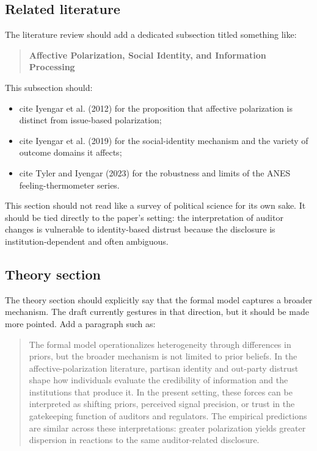 \documentclass[12pt]{article}
\begin{document}
\subsection{Related literature}

The literature review should add a dedicated subsection titled something like:

\begin{quote}
\textbf{Affective Polarization, Social Identity, and Information Processing}
\end{quote}

This subsection should:
\begin{itemize}
    \item cite Iyengar et al. (2012) for the proposition that affective polarization is distinct from issue-based polarization;
    \item cite Iyengar et al. (2019) for the social-identity mechanism and the variety of outcome domains it affects;
    \item cite Tyler and Iyengar (2023) for the robustness and limits of the ANES feeling-thermometer series.
\end{itemize}

This section should not read like a survey of political science for its own sake. It should be tied directly to the paper's setting: the interpretation of auditor changes is vulnerable to identity-based distrust because the disclosure is institution-dependent and often ambiguous.

\subsection{Theory section}

The theory section should explicitly say that the formal model captures a broader mechanism. The draft currently gestures in that direction, but it should be made more pointed. Add a paragraph such as:

\begin{quote}
The formal model operationalizes heterogeneity through differences in priors, but the broader mechanism is not limited to prior beliefs. In the affective-polarization literature, partisan identity and out-party distrust shape how individuals evaluate the credibility of information and the institutions that produce it. In the present setting, these forces can be interpreted as shifting priors, perceived signal precision, or trust in the gatekeeping function of auditors and regulators. The empirical predictions are similar across these interpretations: greater polarization yields greater dispersion in reactions to the same auditor-related disclosure.
\end{quote}
\end{document}
